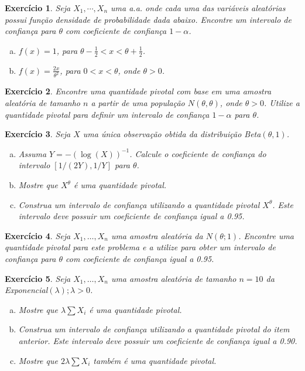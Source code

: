 \documentclass[letter,11pt]{article}
\newtheorem{exer}{Exercício}
\begin{document}
\begin{exer} \rm %
Seja $X_1,\cdots,X_{n}$ uma a.a. onde cada uma das variáveis aleatórias possui função densidade de probabilidade dada abaixo. Encontre um intervalo de confiança para $\theta$ com coeficiente de confiança $1-\alpha$.
\begin{enumerate}[a)]
  \item $f(x)=1$, para $\theta-\frac{1}{2}<x<\theta+\frac{1}{2}$.
  \item $f(x)=\frac{2x}{\theta^2}$, para $0<x<\theta$, onde $\theta>0$.
\end{enumerate}
\end{exer}


\begin{exer} \rm
Encontre uma quantidade pivotal com base em uma amostra aleatória de tamanho $n$ a partir de uma população $N(\theta,\theta)$, onde $\theta>0$. Utilize a quantidade pivotal para definir um intervalo de confiança $1-\alpha$ para $\theta$.
\end{exer}


\begin{exer} \rm
Seja $X$ uma única observação obtida da distribuição Beta$(\theta,1)$.
\begin{enumerate}[a)]
  \item Assuma $Y = -(\log(X))^{-1}$. Calcule o coeficiente de confiança do intervalo $[1/(2Y), 1/Y]$ para $\theta$. 
  \item Mostre que $X^{\theta}$ é uma quantidade pivotal.
  \item Construa um intervalo de confiança utilizando a quantidade pivotal $X^{\theta}$. Este intervalo deve
possuir um coeficiente de confiança igual a 0.95.
\end{enumerate}
\end{exer}



\begin{exer} \rm
Seja $X_1, \ldots, X_n$ uma amostra aleatória da $N(\theta; 1)$. Encontre uma quantidade pivotal para este problema e a utilize para obter um intervalo de confiança para $\theta$ com coeficiente de confiança igual a 0.95.
\end{exer}


\begin{exer} \rm
Seja $X_1, \ldots, X_n$ uma amostra aleatória de tamanho $n = 10$ da Exponencial$(\lambda); \lambda > 0$.
\begin{enumerate}[a)]
  \item Mostre que $\lambda\sum X_i$ é uma quantidade pivotal.
  \item Construa um intervalo de confiança utilizando a quantidade pivotal do item anterior. Este intervalo deve possuir um coeficiente de confiança igual a 0.90.
  \item Mostre que $2\lambda\sum X_i$ também é uma quantidade pivotal.
\end{enumerate}
\end{exer}
\end{document}
